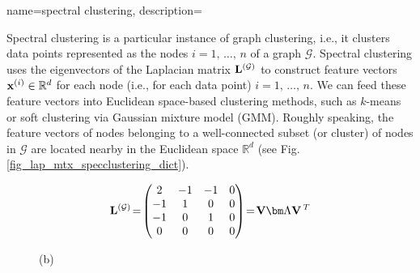 {
{name={spectral clustering},
	description={Spectral clustering is a particular instance of 
		graph clustering, i.e., it clusters data points 
		represented as the nodes $i=1, \,\ldots, \,n$ of a graph $\mathcal{G}$. 
		Spectral clustering uses the eigenvectors of the Laplacian matrix ${\bf L}^{(\mathcal{G})}$ 
		to construct feature vectors ${\bf x}^{(i)} \in \mathbb{R}^{d}$ 
		for each node (i.e., for each data point) $i=1, \,\ldots, \,n$. We can feed these feature vectors 
		into Euclidean space-based clustering methods, such as $k$-means 
		or soft clustering via Gaussian mixture model (GMM). Roughly speaking, the feature vectors of nodes 
		belonging to a well-connected subset (or cluster) of nodes in $\mathcal{G}$ are located 
		nearby in the Euclidean space $\mathbb{R}^{d}$ (see Fig. \ref{fig_lap_mtx_specclustering_dict}). 
		\begin{figure}[H]
			\begin{center}
				\begin{minipage}{0.4\textwidth}
				\end{minipage} 
				\hspace*{5mm}
				\begin{minipage}{0.4\textwidth}
					\begin{equation} 
						{\bf L}^{(\mathcal{G})}\!=\!
						\begin{pmatrix} 
							2 & -1 & -1 & 0 \\ 
							-1 & 1 & 0 & 0 \\  
							-1 & 0 & 1 & 0 \\ 
							0 & 0 & 0 & 0 
						\end{pmatrix}\!=\!\mathbf{V} {\bm \Lambda} \mathbf{V}\,^{T}  
						\nonumber
					\end{equation} 
					\begin{minipage}{\textwidth}
						\vspace{3ex}
						\centering
						{\selectfont (b)}
					\end{minipage}
				\end{minipage}
				\vspace*{20mm}\\
				\begin{minipage}{0.4\textwidth}
			\begin{tikzpicture}[scale=3]


\end{tikzpicture}
\end{minipage}
\end{center}
\end{figure}}}}
